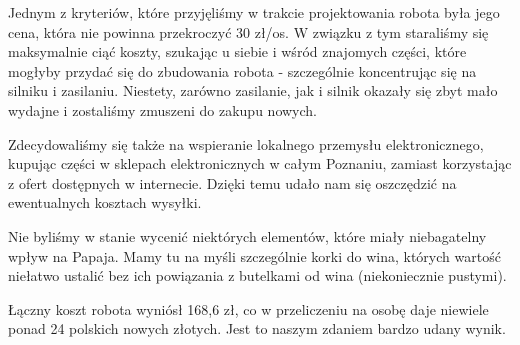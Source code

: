 Jednym z kryteriów, które przyjęliśmy w trakcie projektowania robota była jego cena, która nie powinna przekroczyć 30 zł/os. W związku z tym staraliśmy się maksymalnie ciąć koszty, szukając u siebie i wśród znajomych części, które mogłyby przydać się do zbudowania robota - szczególnie koncentrując się na silniku i zasilaniu. Niestety, zarówno zasilanie, jak i silnik okazały się zbyt mało wydajne i zostaliśmy zmuszeni do zakupu nowych.

Zdecydowaliśmy się także na wspieranie lokalnego przemysłu elektronicznego, kupując części w sklepach elektronicznych w całym Poznaniu, zamiast korzystając z ofert dostępnych w internecie. Dzięki temu udało nam się oszczędzić na ewentualnych kosztach wysyłki.

Nie byliśmy w stanie wycenić niektórych elementów, które miały niebagatelny wpływ na Papaja. Mamy tu na myśli szczególnie korki do wina, których wartość niełatwo ustalić bez ich powiązania z butelkami od wina (niekoniecznie pustymi). 

Łączny koszt robota wyniósł 168,6 zł, co w przeliczeniu na osobę daje niewiele ponad 24 polskich nowych złotych. Jest to naszym zdaniem bardzo udany wynik.

